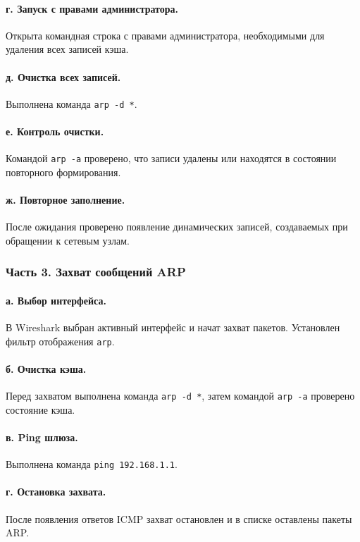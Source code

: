\documentclass[a4paper,14pt,oneside]{extarticle}
\begin{document}
\paragraph{г. Запуск с правами администратора.}
Открыта командная строка с правами администратора, необходимыми для
удаления всех записей кэша.

\paragraph{д. Очистка всех записей.}
Выполнена команда \texttt{arp -d *}.

\paragraph{е. Контроль очистки.}
Командой \texttt{arp -a} проверено, что записи удалены или находятся в
состоянии повторного формирования.

\paragraph{ж. Повторное заполнение.}
После ожидания проверено появление динамических записей, создаваемых при
обращении к сетевым узлам.

\subsubsection{Часть 3. Захват сообщений ARP}

\paragraph{а. Выбор интерфейса.}
В Wireshark выбран активный интерфейс и начат захват пакетов. Установлен
фильтр отображения \texttt{arp}.

\paragraph{б. Очистка кэша.}
Перед захватом выполнена команда \texttt{arp -d *}, затем командой
\texttt{arp -a} проверено состояние кэша.

\paragraph{в. Ping шлюза.}
Выполнена команда \texttt{ping 192.168.1.1}.

\paragraph{г. Остановка захвата.}
После появления ответов ICMP захват остановлен и в списке оставлены
пакеты ARP.
\end{document}
